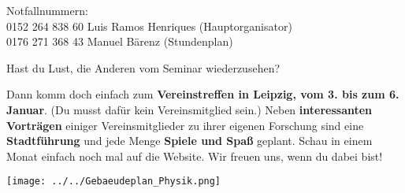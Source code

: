 {\parskip=-1pt








\vspace{3ex}
}

\vspace{0.7cm}

Notfallnummern:\\
0152 264 838 60 Luis Ramos Henriques (Hauptorganisator)\\
0176 271 368 43 Manuel Bärenz (Stundenplan)

\begin{center}\Large Hast du Lust, die Anderen vom Seminar wiederzusehen?\end{center}

Dann komm doch einfach zum \textbf{Vereinstreffen in Leipzig, vom 3. bis zum 6. Januar}. (Du musst dafür kein Vereinsmitglied sein.) Neben \textbf{interessanten Vorträgen} einiger Vereinsmitglieder zu ihrer eigenen Forschung sind eine \textbf{Stadtführung} und jede Menge \textbf{Spiele und Spaß} geplant. Schau in einem Monat einfach noch mal auf die Website. Wir freuen uns, wenn du dabei bist!

\vspace{0cm}

\begin{center}
	\texttt{[image: ../../Gebaeudeplan\_Physik.png]}
\end{center}

\cleardoublepage
